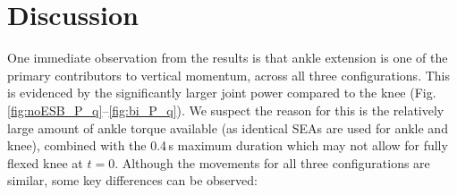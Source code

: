 \documentclass[letterpaper, 10 pt, conference]{ieeeconf}  %
\begin{document}
\section{Discussion} \label{sec:discussion}


One immediate observation from the results is that ankle extension is one of the primary contributors to vertical momentum, across all three configurations. This is evidenced by the significantly larger joint power compared to the knee (Fig. \ref{fig:noESB_P_q}--\ref{fig:bi_P_q}). We suspect the reason for this is the relatively large amount of ankle torque available (as identical SEAs are used for ankle and knee), combined with the 0.4\,s maximum duration which may not allow for fully flexed knee at $t=0$. Although the movements for all three configurations are similar, some key differences can be observed:
\end{document}
